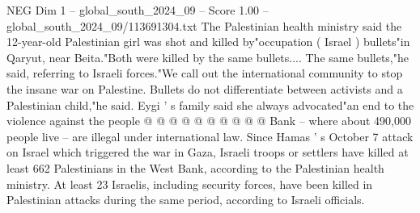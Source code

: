 \begin{textsample}{NEG Dim 1 – global\_south\_2024\_09 – Score 1.00 – global\_south\_2024\_09/113691304.txt}
The Palestinian health ministry said the 12-year-old Palestinian girl was shot and killed by"occupation ( Israel ) bullets"in Qaryut, near Beita."Both were killed by the same bullets....
The same bullets,"he said, referring to Israeli forces."We call out the international community to stop the insane war on Palestine.
Bullets do not differentiate between activists and a Palestinian child,"he said.
Eygi ' s family said she always advocated"an end to the violence against the people @ @ @ @ @ @ @ @ @ @ Bank -- where about 490,000 people live -- are illegal under international law.
Since Hamas ' s October 7 attack on Israel which triggered the war in Gaza, Israeli troops or settlers have killed at least 662 Palestinians in the West Bank, according to the Palestinian health ministry.
At least 23 Israelis, including security forces, have been killed in Palestinian attacks during the same period, according to Israeli officials.

\end{textsample}
